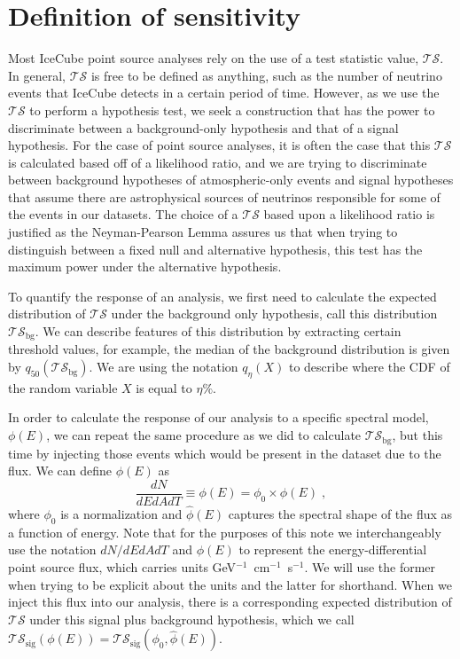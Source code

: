 \documentclass[a4paper,11pt]{article}
\newcommand\ts{\mathcal{TS}}
\newcommand\tsbg{\mathcal{TS_{\mathrm{bg}}}}
\begin{document}
\section{Definition of sensitivity}
Most IceCube point source analyses rely on the use of a test statistic value, $\ts$. In general, $\ts$ is free to be defined as anything, such as the number of neutrino events that IceCube detects in a certain period of time. However, as we use the $\ts$ to perform a hypothesis test, we seek a construction that has the power to discriminate between a background-only hypothesis and that of a signal hypothesis. For the case of point source analyses, it is often the case that this $\ts$ is calculated based off of a likelihood ratio, and we are trying to discriminate between background hypotheses of atmospheric-only events and signal hypotheses that assume there are astrophysical sources of neutrinos responsible for some of the events in our datasets. The choice of a $\ts$ based upon a likelihood ratio is justified as the Neyman-Pearson Lemma assures us that when trying to distinguish between a fixed null and alternative hypothesis, this test has the maximum power under the alternative hypothesis.

To quantify the response of an analysis, we first need to calculate the expected distribution of $\ts$ under the background only hypothesis, call this distribution $\tsbg$. We can describe features of this distribution by extracting certain threshold values, for example, the median of the background distribution is given by $q_{50}(\tsbg)$. We are using the notation $q_{\eta}(X)$ to describe where the CDF of the random variable $X$ is equal to $\eta \%$.

In order to calculate the response of our analysis to a specific spectral model, $\phi(E)$, we can repeat the same procedure as we did to calculate $\tsbg$, but this time by injecting those events which would be present in the dataset due to the flux. We can define $\phi(E)$ as 
\begin{equation}
     \frac{dN}{dEdAdT} \equiv \phi(E) = \phi_0 \times \hat{\phi}(E) \; ,
\end{equation}
where $\phi_0$ is a normalization and $\hat{\phi}(E)$ captures the spectral shape of the flux as a function of energy. Note that for the purposes of this note we interchangeably use the notation $dN\big/dEdAdT$ and $\phi(E)$ to represent the energy-differential point source flux, which carries units GeV$^{-1}$~cm$^{-1}$~s$^{-1}$. We will use the former when trying to be explicit about the units and the latter for shorthand. When we inject this flux into our analysis, there is a corresponding expected distribution of $\ts$ under this signal plus background hypothesis, which we call $\ts_{\mathrm{sig}}(\phi(E)) = \ts_{\mathrm{sig}}(\phi_0, \hat{\phi}(E))$.
\end{document}
